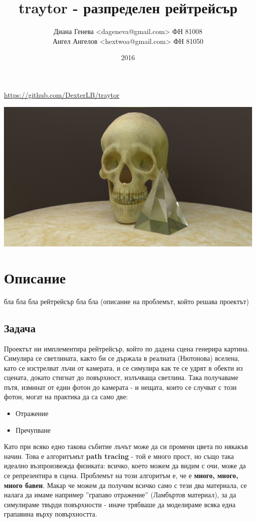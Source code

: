 \documentclass[12pt]{extarticle}
\title{t\textbf{ray}tor - разпределен рейтрейсър}
\author{Диана Генева <dageneva@gmail.com> ФН 81008\\
Ангел Ангелов <hextwoa@gmail.com> ФН 81050}
\date{2016}
\begin{document}
\maketitle
\thispagestyle{empty}

\centerline{\url{https://github.com/DexterLB/traytor}}

\vspace{3cm}
\centerline{\includegraphics[width=\textwidth]{skull.png}}
\pagebreak

\section{Описание}
бла бла бла рейтрейсър бла бла (описание на проблемът, който решава
проектът)

\subsection{Задача}
Проектът ни имплементира рейтрейсър, който по дадена сцена генерира
картина. Симулира се светлината, както би се държала в реалната
(Нютонова) вселена, като се изстрелват лъчи от камерата, и се симулира
как те се удрят в обекти из сцената, докато стигнат до повърхност,
излъчваща светлина. Така получаваме пътя, изминат от един фотон до
камерата - и нещата, които се случват с този фотон, могат на практика да са само две:
\begin{itemize}
	\item Отражение
	\item Пречупване
\end{itemize}
Като при всяко едно такова събитие лъчът може да си промени цвета по
някакъв начин. Това е алгоритъмът \textbf{path tracing} - той е много
прост, но също така идеално възпроизвежда физиката:  всичко, което
можем да видим с очи, може да се репрезентира в сцена. Проблемът на
този алгоритъм е, че е \textbf{много, много, много бавен}. Макар че
можем да получим всичко само с тези два материала, се налага да имаме
например ''грапаво отражение'' (Ламбъртов материал), за да симулираме
твърди повърхности - иначе трябваше да моделираме всяка една грапавина
върху повърхността.
\end{document}
